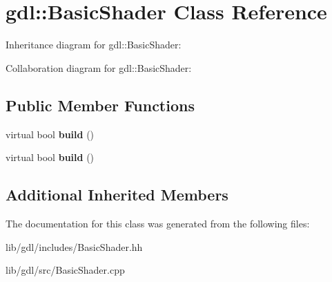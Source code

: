 \hypertarget{classgdl_1_1_basic_shader}{}\section{gdl\+:\+:Basic\+Shader Class Reference}
\label{classgdl_1_1_basic_shader}


Inheritance diagram for gdl\+:\+:Basic\+Shader\+:


Collaboration diagram for gdl\+:\+:Basic\+Shader\+:
\subsection*{Public Member Functions}
\begin{DoxyCompactItemize}
\item 
\hypertarget{classgdl_1_1_basic_shader_a2fbfee8bd2e95b001617bfe34c1e53e4}{}virtual bool {\bfseries build} ()\label{classgdl_1_1_basic_shader_a2fbfee8bd2e95b001617bfe34c1e53e4}

\item 
\hypertarget{classgdl_1_1_basic_shader_a1ac0e4016e7a2859b4d52b72e1c5427a}{}virtual bool {\bfseries build} ()\label{classgdl_1_1_basic_shader_a1ac0e4016e7a2859b4d52b72e1c5427a}

\end{DoxyCompactItemize}
\subsection*{Additional Inherited Members}


The documentation for this class was generated from the following files\+:\begin{DoxyCompactItemize}
\item 
lib/gdl/includes/Basic\+Shader.\+hh\item 
lib/gdl/src/Basic\+Shader.\+cpp\end{DoxyCompactItemize}
